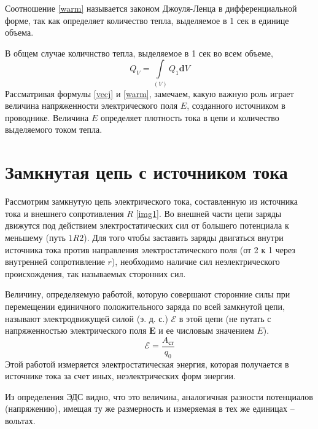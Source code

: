 \documentclass[a4paper,10pt]{book}
\begin{document}
Соотношение \ref{warm} называется законом Джоуля-Ленца в дифференциальной форме, так как определяет количество тепла, выделяемое в 1 сек в единице объема.

В общем случае количнство тепла, выделяемое в 1 сек во всем объеме,
\begin{equation}\label{warmVol}
 Q_V = \int\limits_{(V)}Q_1\mathbf{d}V
\end{equation}
Рассматривая формулы \ref{vecj} и \ref{warm}, замечаем, какую важную роль играет величина напряженности электрического поля $E$, созданного источником в проводнике. Величина $E$ определяет плотность тока в цепи и количество выделяемого током тепла.
\chapter{Замкнутая цепь с источником тока}
Рассмотрим замкнутую цепь электрического тока, составленную из источника тока и внешнего сопротивления $R$ \ref{img1}. Во внешней части цепи заряды движутся под действием электростатических сил от большего потенциала к меньшему (путь $1R2$). Для того чтобы заставить заряды двигаться внутри источника тока против направления электростатического поля (от 2 к 1 через внутренней сопротивление $r$), необходимо наличие сил неэлектрического происхождения, так называемых сторонних сил.

Величину, определяемую работой, которую совершают сторонние силы при перемещении единичного положительного заряда по всей замкнутой цепи, называют электродвижущей силой (э. д. с.) $\mathcal{E}$ в этой цепи (не путать с напряженностью электрического поля $\mathbf{E}$ и ее числовым значением $E$).
\begin{equation}\label{eds}
 \mathcal{E} = \frac{A_\text{ст}}{q_0}
\end{equation}
Этой работой измеряется электростатическая энергия, которая получается в источнике тока за счет иных, неэлектрических форм энергии.

Из определения ЭДС видно, что это величина, аналогичная разности потенциалов (напряжению), имещая ту же размерность и измеряемая в тех же
единицах -- вольтах.
\end{document}
